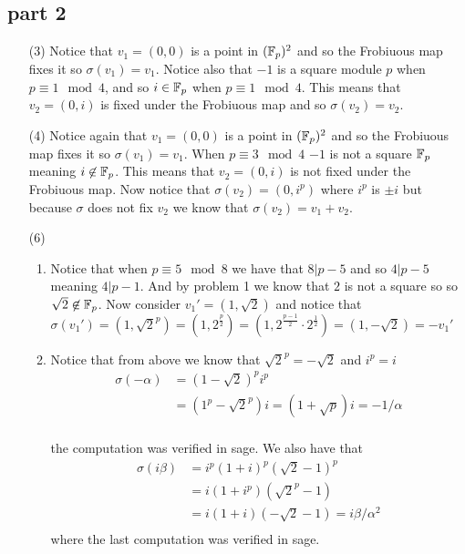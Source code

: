 \documentclass[12pt]{amsart}
\begin{document}
\subsection*{part 2}
\begin{itemize}
    \item[(3)] Notice that $v_1=(0,0)$ is a point in $(\mathbb{F}_p)^2$ and so the Frobiuous map fixes it so $\sigma(v_1)=v_1$. Notice also that $-1$ is a square module $p$ when $p\equiv 1\mod 4$, and so $i\in \mathbb{F}_p$ when $p\equiv 1\mod 4$. This means that $v_2=(0,i)$ is fixed under the Frobiuous map and so $\sigma(v_2)=v_2$.\\
    
    \item[(4)] Notice again that $v_1=(0,0)$ is a point in $(\mathbb{F}_p)^2$ and so the Frobiuous map fixes it so $\sigma(v_1)=v_1$. When $p\equiv 3\mod 4$ $-1$ is not a square $\mathbb{F}_p$ meaning $i\not\in \mathbb{F}_p$. This means that $v_2=(0,i)$ is not fixed under the Frobiuous map. Now notice that $\sigma(v_2)=(0,i^p)$ where $i^p$ is $\pm i$ but because $\sigma$ does not fix $v_2$ we know that $\sigma(v_2)=v_1+v_2$.\\
    
    \item[(6)] \begin{enumerate}[label=(\alph*)]
        \item Notice that when $p\equiv 5\mod 8$ we have that $8|p-5$ and so $4|p-5$ meaning $4|p-1$. And by problem 1 we know that $2$ is not a square so so $\sqrt{2}\not\in \mathbb{F}_p$. Now consider $v_1'=(1,\sqrt{2})$ and notice that $\sigma(v_1')=(1,\sqrt{2}^p)=(1,2^{\frac{p}{2}})=(1,2^{\frac{p-1}{2}}\cdot 2^\frac{1}{2})=(1,-\sqrt 2)=-v_1'$\\
        
        \item Notice that from above we know that $\sqrt{2}^p=-\sqrt{2}$ and $i^p=i$ 
        \begin{align*}
            \sigma(-\alpha)&=(1-\sqrt{2})^pi^p\\
            &=(1^p-\sqrt{2}^p)i= (1+\sqrt p) i=-1/\alpha\\
        \end{align*}

        the computation was verified in sage. We also have that
        \begin{align*}
            \sigma(i\beta)&=i^p(1+i)^p(\sqrt{2}-1)^p\\
            &=i(1+i^p)(\sqrt{2}^p-1)\\
            &=i(1+i)(-\sqrt{2}-1)=i\beta/\alpha^2\\
        \end{align*}
        where the last computation was verified in sage.
        

\end{enumerate}
\end{itemize}
\end{document}
